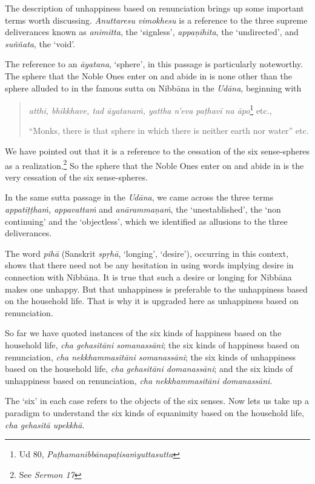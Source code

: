 The description of unhappiness based on renunciation brings up some important terms worth discussing. \emph{Anuttaresu vimokhesu} is a reference to the three supreme deliverances known as \emph{animitta}, the `signless', \emph{appaṇihita}, the `undirected', and \emph{suññata}, the `void'.

The reference to an \emph{āyatana}, `sphere', in this passage is particularly noteworthy. The sphere that the Noble Ones enter on and abide in is none other than the sphere alluded to in the famous sutta on Nibbāna in the \emph{Udāna}, beginning with

\begin{quote}
\emph{atthi, bhikkhave, tad āyatanaṁ, yattha n'eva paṭhavī na āpo}\footnote{Ud 80, \emph{Paṭhamanibbānapaṭisaṁyuttasutta}} etc.,

``Monks, there is that sphere in which there is neither earth nor water'' etc.
\end{quote}

We have pointed out that it is a reference to the cessation of the six sense-spheres as a realization.\footnote{See \emph{Sermon 17}} So the sphere that the Noble Ones enter on and abide in is the very cessation of the six sense-spheres.

In the same sutta passage in the \emph{Udāna}, we came across the three terms \emph{appatiṭṭhaṁ, appavattaṁ} and \emph{anārammaṇaṁ}, the `unestablished', the `non continuing' and the `objectless', which we identified as allusions to the three deliverances.

The word \emph{pihā} (Sanskrit \emph{spṛhā}, `longing', `desire'), occurring in this context, shows that there need not be any hesitation in using words implying desire in connection with Nibbāna. It is true that such a desire or longing for Nibbāna makes one unhappy. But that unhappiness is preferable to the unhappiness based on the household life. That is why it is upgraded here as unhappiness based on renunciation.

So far we have quoted instances of the six kinds of happiness based on the household life, \emph{cha gehasitāni somanassāni}; the six kinds of happiness based on renunciation, \emph{cha nekkhammasitāni somanassāni}; the six kinds of unhappiness based on the household life, \emph{cha gehasitāni domanassāni}; and the six kinds of unhappiness based on renunciation, \emph{cha nekkhammasitāni domanassāni}.

The `six' in each case refers to the objects of the six senses. Now lets us take up a paradigm to understand the six kinds of equanimity based on the household life, \emph{cha gehasitā upekkhā}.

